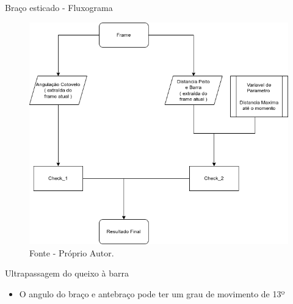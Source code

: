 \begin{frame}{Braço esticado - Fluxograma}
    \begin{figure}[!ht]
        \centering
            \includegraphics[scale=0.35]{img/desenvolvimento/bracoEsticado/fluxograma.png}
        \caption*{Fonte - Próprio Autor.}
    \end{figure}
\end{frame}

\begin{frame}{Ultrapassagem do queixo à barra}
    \begin{itemize}
        \item O angulo do braço e antebraço pode ter um grau de movimento de 13º
    \end{itemize}
\end{frame}


